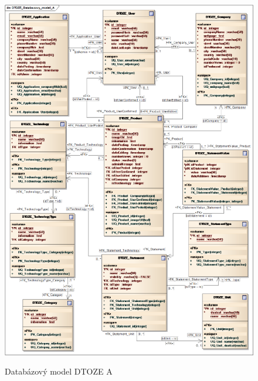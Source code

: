 \documentclass[11pt,a4paper]{article}
\begin{document}
\begin{figure}[H] 
\centering 
\caption{Databázový model DTOZE A} 
\vspace{0.1cm}
\includegraphics[scale=0.75]{DTOZE_fyzA_n} 
\label{fig:DTOZE_fyz_A}
\end{figure} 
\newpage
\end{document}
